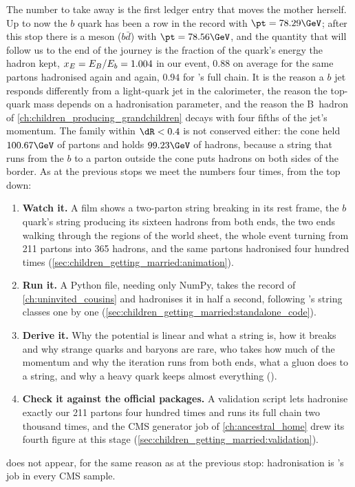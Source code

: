 The number to take away is the first ledger entry that moves the mother
herself. Up to now the $b$ quark has been a row in the record with
$\pt=78.29\GeV$; after this stop there is a \Bstarbar meson ($b\bar d$) with
$\pt=78.56\GeV$, and the quantity that will follow us to the end of the
journey is the fraction of the quark's energy the hadron kept,
$x_E=E_B/E_b=1.004$ in our event, $0.88$ on average for the same partons
hadronised again and again, $0.94$ for \PYTHIA's full chain. It is the
reason a $b$ jet responds differently from a light-quark jet in the
calorimeter, the reason the top-quark mass depends on a hadronisation
parameter, and the reason the B~hadron of \cref{ch:children_producing_grandchildren}
decays with four fifths of the jet's momentum. The family within $\dR<0.4$
is not conserved either: the cone held $100.67\GeV$ of partons and holds
$99.23\GeV$ of hadrons, because a string that runs from the $b$ to a parton
outside the cone puts hadrons on both sides of the border. As at the previous
stops we meet the numbers four times, from the top down:
\begin{enumerate}[nosep]
  \item \textbf{Watch it.} A film shows a two-parton string breaking in its
    rest frame, the $b$ quark's string producing its sixteen hadrons from
    both ends, the two ends walking through the regions of the world sheet,
    the whole event turning from 211 partons into 365 hadrons, and the same
    partons hadronised four hundred times
    (\cref{sec:children_getting_married:animation}).
  \item \textbf{Run it.} A Python file, needing only NumPy, takes the record
    of \cref{ch:uninvited_cousins} and hadronises it in half a second,
    following \PYTHIA's string classes one by one
    (\cref{sec:children_getting_married:standalone_code}).
  \item \textbf{Derive it.} Why the potential is linear and what a string is,
    how it breaks and why strange quarks and baryons are rare, who takes how
    much of the momentum and why the iteration runs from both ends, what a
    gluon does to a string, and why a heavy quark keeps almost everything
    ().
  \item \textbf{Check it against the official packages.} A validation script
    lets \PYTHIA hadronise exactly our 211 partons four hundred times and
    runs its full chain two thousand times, and the CMS generator job of
    \cref{ch:ancestral_home} drew its fourth figure at this stage
    (\cref{sec:children_getting_married:validation}).
\end{enumerate}
\MG does not appear, for the same reason as at the previous stop:
hadronisation is \PYTHIA's job in every CMS sample.

